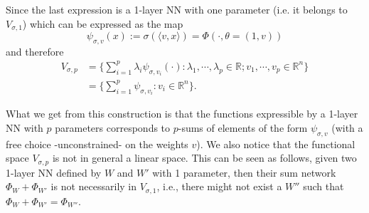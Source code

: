 \documentclass[11pt]{article} %
\begin{document}
Since the last expression is a 1-layer NN with one parameter (i.e. it belongs to $V_{\sigma,1}$) which can be expressed as the map
\begin{equation}
	\psi_{\sigma, v}(x) := \sigma(\langle v, x\rangle) = \Phi(\cdot, \theta = (1, v))
\end{equation}
and therefore
\begin{align}
	V_{\sigma, p} &= \{ \sum_{i=1}^p \lambda_i \psi_{\sigma, v_i}(\cdot): \lambda_1,\cdots,\lambda_p\in\mathbb{R}; v_1,\cdots, v_p \in \mathbb{R}^n\} \\
			&= \{ \sum_{i=1}^p \psi_{\sigma, v_i} : v_i\in\mathbb{R}^n\}.
\end{align}
\par
What we get from this construction is that the functions expressible by a 1-layer NN with $p$ parameters corresponds to $p$-sums of elements of the form $\psi_{\sigma, v}$ (with a free choice -unconstrained- on the weights $v$). We also notice that the functional space $V_{\sigma, p}$ is not in general a linear space.
\newline
This can be seen as follows, given two 1-layer NN defined by $W$ and $W'$ with 1 parameter, then their sum network $\Phi_W + \Phi_{W'}$ is not necessarily in $V_{\sigma, 1}$, i.e., there might not exist a $W''$ such that $\Phi_W + \Phi_{W'} = \Phi_{W''}$. 
\end{document}
